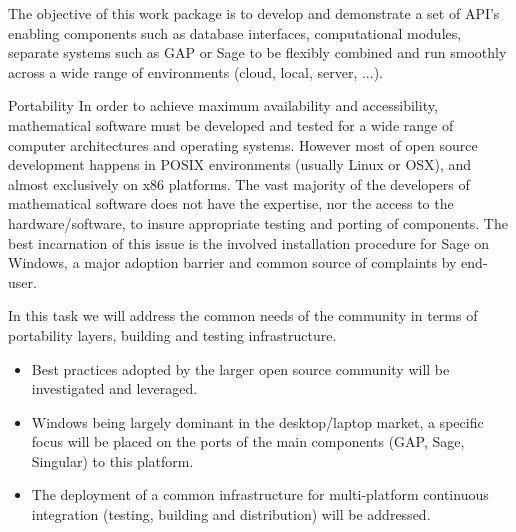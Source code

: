 \addtocounter{wpno}{1}
\begin{Workpackage}{\thewpno}
  \WPTitle{\wpname{\thewpno}}

  \begin{WPObjectives}
    The objective of this work package is to develop and demonstrate a
    set of API's enabling components such as database interfaces,
    computational modules, separate systems such as GAP or Sage to be
    flexibly combined and run smoothly across a wide range of
    environments (cloud, local, server, ...).
  \end{WPObjectives}

  \begin{WPDescription}
  \end{WPDescription}


  \begin{task}{Portability}
    In order to achieve maximum availability and accessibility,
    mathematical software must be developed and tested for a wide range
    of computer architectures and operating systems.  However most of
    open source development happens in POSIX environments (usually
    Linux or OSX), and almost exclusively on x86 platforms.  The vast
    majority of the developers of mathematical software does not have
    the expertise, nor the access to the hardware/software, to insure
    appropriate testing and porting of components.  The best
    incarnation of this issue is the involved installation procedure
    for Sage on Windows, a major adoption barrier and common source of
    complaints by end-user.

    In this task we will address the common needs of the community in
    terms of portability layers, building and testing infrastructure.

    \begin{itemize}
    \item Best practices adopted by the larger open source community
      will be investigated and leveraged.
    \item Windows being largely dominant in the desktop/laptop market,
      a specific focus will be placed on the ports of the main
      components (GAP, Sage, Singular) to this platform.
    \item The deployment of a common infrastructure for multi-platform
      continuous integration (testing, building and distribution) will
      be addressed.
    \end{itemize}


\end{task}
\end{Workpackage}
